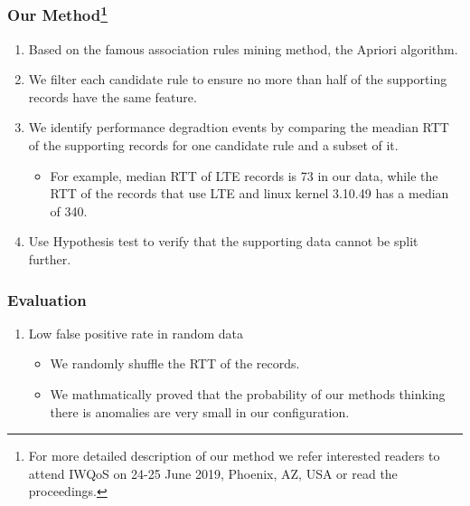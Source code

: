\begin{frame}
    \frametitle{Our Method\footnote{For more detailed description of our method we refer interested readers to attend IWQoS on 24-25 June 2019, Phoenix, AZ, USA or read the proceedings.}}
    \begin{enumerate}
        \item Based on the famous association rules mining method, the Apriori algorithm.
        \item We filter each candidate rule to ensure no more than half of the supporting records have the same feature.
        \item We identify performance degradtion events by comparing the meadian RTT of the supporting records for one candidate rule and a subset of it.
        \begin{itemize}
            \item For example, median RTT of LTE records is 73 in our data, while the RTT of the records that use LTE and linux kernel 3.10.49 has a median of 340.
        \end{itemize}
        \item Use Hypothesis test to verify that the supporting data cannot be split further.
    \end{enumerate}
\end{frame}

%

\begin{frame}
    \frametitle{Evaluation}
    \begin{enumerate}
        \item Low false positive rate in random data
        \begin{itemize}
            \item We randomly shuffle the RTT of the records.
            \item We mathmatically proved that the probability of our methods thinking there is anomalies are very small in our configuration.
        \end{itemize}
    \end{enumerate}
\end{frame}


